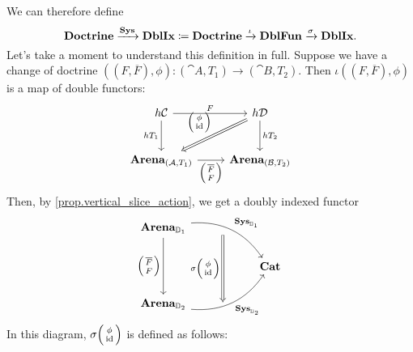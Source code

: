 \documentclass[DynamicalBook]{subfiles}
\begin{document}
We can therefore define
\[
\textbf{Doctrine} \xrightarrow{\textbf{Sys}} \textbf{DblIx} \coloneqq \textbf{Doctrine} \xrightarrow{\iota}
\textbf{DblFun} \xrightarrow{\sigma} \textbf{DblIx}.
\]
Let's take a moment to understand this definition in full. Suppose we have a
change of doctrine $((F, \overline{F}), \phi) : (\cat{A}, T_1) \to (\cat{B},
T_2)$. Then $\iota((F, \overline{F}), \phi)$ is a map of double functors:
\[
  \begin{tikzcd}[row sep = large]
    h\cat{C} \ar[r, "F"]\ar[d, "hT_1"'] & h\cat{D} \ar[d, "hT_2"]\ar[dl, Rightarrow, "{\littlelens{\phi}{\id}}"'] \\
    \Cat{Arena}_{(\cat{A}, T_1)}\ar[r, "{\lens{\overline{F}}{F}}"']
     & \Cat{Arena}_{(\cat{B}, T_2)}
  \end{tikzcd}
\]
Then, by \cref{prop.vertical_slice_action}, we get a doubly indexed functor
\[
\begin{tikzcd}
\Cat{Arena}_{\dd_1} \arrow[dd, "{\littlelens{\overline{F}}{F}}"'] \arrow[rrd, "{
  \Cat{Sys}_{\dd_1}}", bend left] & {}
\arrow[dd, "{\sigma \littlelens{\phi}{\id}}"', Rightarrow] &      \\
  &   & \Cat{Cat} \\
\Cat{Arena}_{\dd_2} \arrow[rru, bend right, "{\Cat{Sys}_{\dd_2}}"']      & {}   &     
\end{tikzcd}
\]
In this diagram, $\sigma\littlelens{\phi}{\id}$ is defined as follows:
\end{document}
